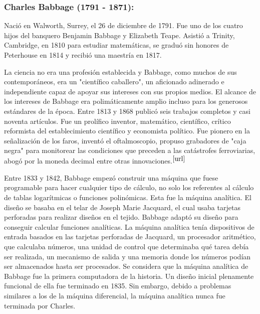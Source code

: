 \documentclass[runningheads,a4paper]{llncs}
\begin{document}
\subsubsection{Charles Babbage (1791 - 1871):} Nació en Walworth, Surrey, el 26 de diciembre de 1791. Fue uno de los cuatro hijos del banquero Benjamin Babbage y Elizabeth Teape. Asistió a Trinity, Cambridge, en 1810 para estudiar matemáticas, se graduó sin honores de Peterhouse en 1814 y recibió una maestría en 1817.
 
La ciencia no era una profesión establecida y Babbage, como muchos de sus contemporáneos, era un "científico caballero", un aficionado adinerado e independiente capaz de apoyar sus intereses con sus propios medios. El alcance de los intereses de Babbage era polimáticamente amplio incluso para los generosos estándares de la época. Entre 1813 y 1868 publicó seis trabajos completos y casi noventa artículos. Fue un prolífico inventor, matemático, científico, crítico reformista del establecimiento científico y economista político. Fue pionero en la señalización de los faros, inventó el oftalmoscopio, propuso grabadores de "caja negra" para monitorear las condiciones que preceden a las catástrofes ferroviarias, abogó por la moneda decimal entre otras innovaciones.$^{\cite{url}}$

Entre 1833 y 1842, Babbage empezó construir una máquina que fuese programable para hacer cualquier tipo de cálculo, no solo los referentes al cálculo de tablas logarítmicas o funciones polinómicas. Esta fue la máquina analítica. El diseño se basaba en el telar de Joseph Marie Jacquard, el cual usaba tarjetas perforadas para realizar diseños en el tejido. Babbage adaptó su diseño para conseguir calcular funciones analíticas. La máquina analítica tenía dispositivos de entrada basados en las tarjetas perforadas de Jacquard, un procesador aritmético, que calculaba números, una unidad de control que determinaba qué tarea debía ser realizada, un mecanismo de salida y una memoria donde los números podían ser almacenados hasta ser procesados. Se considera que la máquina analítica de Babbage fue la primera computadora de la historia. Un diseño inicial plenamente funcional de ella fue terminado en 1835. Sin embargo, debido a problemas similares a los de la máquina diferencial, la máquina analítica nunca fue terminada por Charles. 
\end{document}
